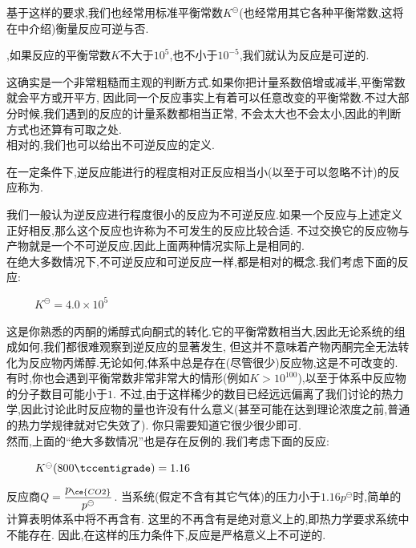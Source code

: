\documentclass{ctexart}
\begin{document}
\indent 基于这样的要求,我们也经常用标准平衡常数$K^\ominus$(也经常用其它各种平衡常数,这将在中介绍)衡量反应可逆与否.
\begin{theorem}[5B.3.2 用平衡常数衡量反应的可逆性]
    ,如果反应的平衡常数$K$不大于$10^5$,也不小于$10^{-5}$,我们就认为反应是可逆的.
\end{theorem}
这确实是一个非常粗糙而主观的判断方式.如果你把计量系数倍增或减半,平衡常数就会平方或开平方,%
因此同一个反应事实上有着可以任意改变的平衡常数.不过大部分时候,我们遇到的反应的计量系数都相当正常,%
不会太大也不会太小,因此的判断方式也还算有可取之处.\\
\indent 相对的,我们也可以给出不可逆反应的定义.
\begin{definition}
    在一定条件下,逆反应能进行的程度相对正反应相当小(以至于可以忽略不计)的反应称为.
\end{definition}
我们一般认为逆反应进行程度很小的反应为不可逆反应.如果一个反应与上述定义正好相反,那么这个反应也许称为不可发生的反应比较合适.%
不过交换它的反应物与产物就是一个不可逆反应,因此上面两种情况实际上是相同的.\\
\indent 在绝大多数情况下,不可逆反应和可逆反应一样,都是相对的概念.我们考虑下面的反应:
\begin{tightcenter}
    \ \ \ \ \ $K^\ominus=4.0\times 10^{5}$
\end{tightcenter}
这是你熟悉的丙酮的烯醇式向酮式的转化.它的平衡常数相当大,因此无论系统的组成如何,我们都很难观察到逆反应的显著发生,%
但这并不意味着产物丙酮完全无法转化为反应物丙烯醇.无论如何,体系中总是存在(尽管很少)反应物,这是不可改变的.\\
\indent 有时,你也会遇到平衡常数非常非常大的情形(例如$K>10^{100}$),以至于体系中反应物的分子数目可能小于$1$.%
不过,由于这样稀少的数目已经远远偏离了我们讨论的热力学,因此讨论此时反应物的量也许没有什么意义(甚至可能在达到理论浓度之前,普通的热力学规律就对它失效了).%
你只需要知道它很少很少即可.\\
\indent 然而,上面的“绝大多数情况”也是存在反例的.我们考虑下面的反应:
\begin{tightcenter}
    \ \ \ \ \ $K^\ominus(800\tccentigrade)=1.16$
\end{tightcenter}
反应商$Q=\dfrac{p_{\ce{CO2}}}{p^\ominus}$.%
当系统(假定不含有其它气体)的压力小于$1.16p^{\ominus}$时,简单的计算表明体系中将不再含有.%
这里的不再含有是绝对意义上的,即热力学要求系统中不能存在.%
因此,在这样的压力条件下,反应是严格意义上不可逆的.
\end{document}
